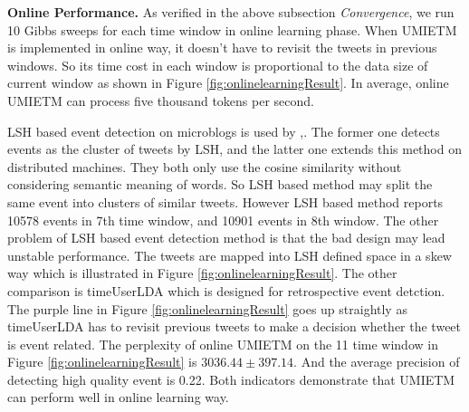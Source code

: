 \documentclass[runningheads,a4paper]{llncs}
\begin{document}
\textbf{Online Performance.}
As verified in the above subsection \textit{Convergence}, we run 10 Gibbs sweeps for each time window in online learning phase.
When UMIETM is implemented in online way, it doesn't have to revisit the tweets in previous windows. 
So its time cost in each window is proportional to the data size of current window  as shown in Figure \ref{fig:onlinelearningResult}.
In average, online UMIETM can process five thousand tokens per second.

LSH based event detection on microblogs is used by \cite{petrovic2010streaming},\cite{mccreadiescalable}. 
The former one detects events as the cluster of tweets by LSH, and the latter one extends this method on distributed machines. 
They both only use the cosine similarity without considering semantic meaning of words. 
So LSH based method may split the same event into clusters of similar tweets.
However LSH based method reports 10578 events in 7th time window, and 10901 events in 8th window. 
The other problem of LSH based event detection method is that the bad design may lead unstable performance. 
The tweets are mapped into LSH defined space in a skew way which is illustrated in Figure \ref{fig:onlinelearningResult}.
The other comparison is timeUserLDA\cite{timeUserLDA2012finding} which is designed for retrospective event detction. 
The purple line in Figure \ref{fig:onlinelearningResult} goes up straightly as timeUserLDA has to revisit previous tweets to make a decision whether the tweet is event related. 
The perplexity of online UMIETM on the 11 time window in Figure \ref{fig:onlinelearningResult} is \(3036.44\pm397.14\). 
And the average precision of detecting high quality event is 0.22.
Both indicators demonstrate that UMIETM can perform well in online learning way. 
\end{document}
